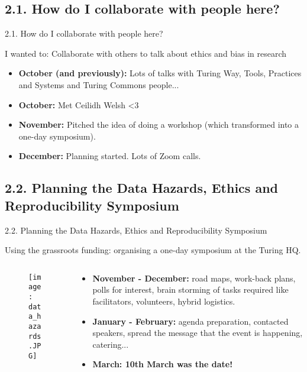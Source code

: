 \documentclass[t]{beamer}
\begin{document}
\subsection{2.1. How do I collaborate with people here?}
\begin{frame}{2.1. How do I collaborate with people here?}
	\begin{block}{I wanted to: Collaborate with others to talk about ethics and bias in research}
  		\begin{itemize}    
  			\item \textbf{October (and previously):} Lots of talks with Turing Way, Tools, Practices and Systems and Turing Commons people...
                \item \textbf{October:} Met Ceilidh Welsh <3
  			\item \textbf{November:} Pitched the idea of doing a workshop (which transformed into a one-day symposium).
                \item \textbf{December:} Planning started. Lots of Zoom calls.
  		\end{itemize}    
	\end{block}
 
\end{frame}

\subsection{2.2. Planning the Data Hazards, Ethics and Reproducibility Symposium}
\begin{frame}{2.2. Planning the Data Hazards, Ethics and Reproducibility Symposium}
	\begin{block}{Using the grassroots funding: organising a one-day symposium at the Turing HQ.}
            \begin{columns}[T,totalwidth=\textwidth]
  		\begin{column}{0.45\textwidth}
                \begin{figure}
				\vspace{-\blocktitlesize}\texttt{[image: data\_hazards.JPG]}
			\end{figure}
            \end{column}
            
            \begin{column}{0.6\textwidth}
            \begin{itemize}  
                \item<2-> \textbf{November - December:} road maps, work-back plans, polls for interest, brain storming of tasks required like facilitators, volunteers, hybrid logistics.
  			\item<3-> \textbf{January - February:} agenda preparation, contacted speakers, spread the message that the event is happening, catering...
                \item<4-> \textbf{March: 10th March was the date!}
  		\end{itemize}  
            \end{column}%
            \end{columns}
	\end{block}
\end{frame}
\end{document}
